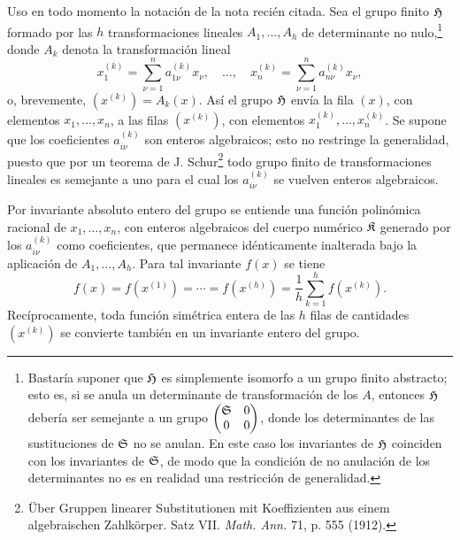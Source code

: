 \documentclass[11pt]{article}
\begin{document}
Uso en todo momento la notación de la nota recién citada. Sea el grupo finito \(\mathfrak H\) formado por las \(h\) transformaciones lineales \(A_1,\ldots,A_h\) de determinante no nulo,\footnote{Bastaría suponer que \(\mathfrak H\) es simplemente isomorfo a un grupo finito abstracto; esto es, si se anula un determinante de transformación de los \(A\), entonces \(\mathfrak H\) debería ser semejante a un grupo \(\begin{pmatrix}\mathfrak S&0\\0&0\end{pmatrix}\), donde los determinantes de las sustituciones de \(\mathfrak S\) no se anulan. En este caso los invariantes de \(\mathfrak H\) coinciden con los invariantes de \(\mathfrak S\), de modo que la condición de no anulación de los determinantes no es en realidad una restricción de generalidad.} donde \(A_k\) denota la transformación lineal
\[
        x_1^{(k)}=\sum_{\nu=1}^{n}a_{1\nu}^{(k)}x_\nu,
        \quad\ldots,\quad
        x_n^{(k)}=\sum_{\nu=1}^{n}a_{n\nu}^{(k)}x_\nu,
\]
o, brevemente, \((x^{(k)})=A_k(x)\). Así el grupo \(\mathfrak H\) envía la fila \((x)\), con elementos \(x_1,\ldots,x_n\), a las filas \((x^{(k)})\), con elementos \(x_1^{(k)},\ldots,x_n^{(k)}\). Se supone que los coeficientes \(a_{i\nu}^{(k)}\) son enteros algebraicos; esto no restringe la generalidad, puesto que por un teorema de J. Schur\footnote{Über Gruppen linearer Substitutionen mit Koeffizienten aus einem algebraischen Zahlkörper. Satz VII. \emph{Math. Ann.} 71, p. 555 (1912).} todo grupo finito de transformaciones lineales es semejante a uno para el cual los \(a_{i\nu}^{(k)}\) se vuelven enteros algebraicos.

Por invariante absoluto entero del grupo se entiende una función polinómica racional de \(x_1,\ldots,x_n\), con enteros algebraicos del cuerpo numérico \(\mathfrak K\) generado por los \(a_{i\nu}^{(k)}\) como coeficientes, que permanece idénticamente inalterada bajo la aplicación de \(A_1,\ldots,A_h\). Para tal invariante \(f(x)\) se tiene
\begin{equation}
        f(x)=f(x^{(1)})=\cdots=f(x^{(h)})
        =\frac1h\sum_{k=1}^{h}f(x^{(k)}).
\end{equation}
Recíprocamente, toda función simétrica entera de las \(h\) filas de cantidades \((x^{(k)})\) se convierte también en un invariante entero del grupo.
\end{document}
